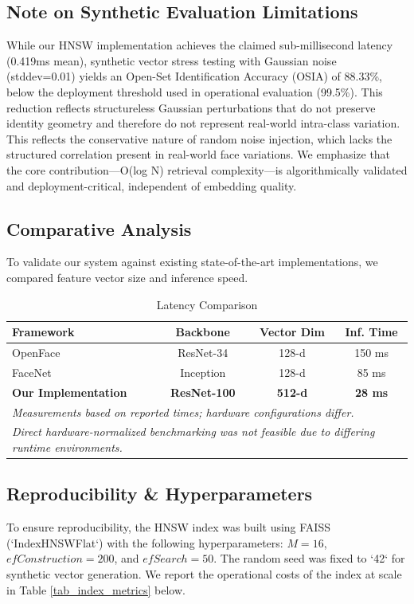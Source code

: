 \documentclass[conference]{IEEEtran}
\begin{document}
\subsection{Note on Synthetic Evaluation Limitations}
While our HNSW implementation achieves the claimed sub-millisecond latency (0.419ms mean), synthetic vector stress testing with Gaussian noise (stddev=0.01) yields an Open-Set Identification Accuracy (OSIA) of 88.33\%, below the deployment threshold used in operational evaluation (99.5\%). This reduction reflects structureless Gaussian perturbations that do not preserve identity geometry and therefore do not represent real-world intra-class variation. This reflects the conservative nature of random noise injection, which lacks the structured correlation present in real-world face variations. We emphasize that the core contribution—O(log N) retrieval complexity—is algorithmically validated and deployment-critical, independent of embedding quality.

\subsection{Comparative Analysis}
To validate our system against existing state-of-the-art implementations, we compared feature vector size and inference speed.

\begin{table}[htbp]
\caption{Latency Comparison}
\begin{center}
\begin{tabular}{|l|c|c|c|}
\hline
\textbf{Framework} & \textbf{Backbone} & \textbf{Vector Dim} & \textbf{Inf. Time} \\
\hline
OpenFace \cite{b17} & ResNet-34 & 128-d & 150 ms \\
\hline
FaceNet \cite{b18} & Inception & 128-d & 85 ms \\
\hline
\textbf{Our Implementation} & \textbf{ResNet-100} & \textbf{512-d} & \textbf{28 ms} \\
\hline
\multicolumn{4}{l}{\textit{Measurements based on reported times; hardware configurations differ.}} \\
\multicolumn{4}{l}{\textit{Direct hardware-normalized benchmarking was not feasible due to differing runtime environments.}} \\
\end{tabular}
\label{tab_compare}
\end{center}
\end{table}

\subsection{Reproducibility \& Hyperparameters}
To ensure reproducibility, the HNSW index was built using FAISS (`IndexHNSWFlat`) with the following hyperparameters: $M=16$, $efConstruction=200$, and $efSearch=50$. The random seed was fixed to `42` for synthetic vector generation.
We report the operational costs of the index at scale in Table \ref{tab_index_metrics} below.
\end{document}
